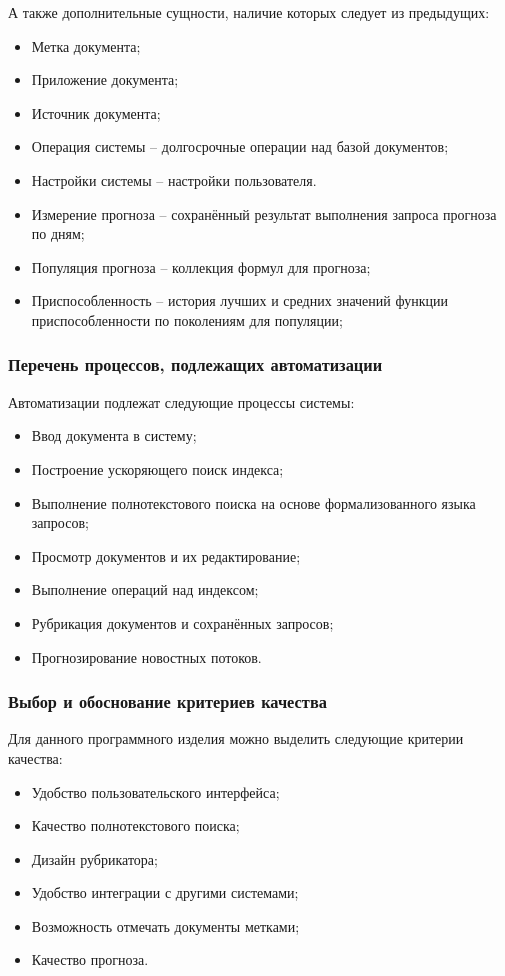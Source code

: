 А также дополнительные сущности, наличие которых следует из предыдущих:
\begin{itemize}
\item Метка документа;
\item Приложение документа;
\item Источник документа;
\item Операция системы -- долгосрочные операции над базой документов;
\item Настройки системы -- настройки пользователя.
\item Измерение прогноза -- сохранённый результат выполнения запроса прогноза по дням;
\item Популяция прогноза -- коллекция формул для прогноза;
\item Приспособленность -- история лучших и средних значений функции приспособленности по поколениям для популяции;
\end{itemize}

\subsubsection{Перечень процессов, подлежащих автоматизации}
Автоматизации подлежат следующие процессы системы:
\begin{itemize}
\item Ввод документа в систему;
\item Построение ускоряющего поиск индекса;
\item Выполнение полнотекстового поиска на основе формализованного языка
запросов;
\item Просмотр документов и их редактирование;
\item Выполнение операций над индексом;
\item Рубрикация документов и сохранённых запросов;
\item Прогнозирование новостных потоков.
\end{itemize}

\subsubsection{Выбор и обоснование критериев качества}

Для данного программного изделия можно выделить следующие критерии качества:
\begin{itemize}
\item Удобство пользовательского интерфейса;
\item Качество полнотекстового поиска;
\item Дизайн рубрикатора;
\item Удобство интеграции с другими системами;
\item Возможность отмечать документы метками;
\item Качество прогноза.
\end{itemize}

